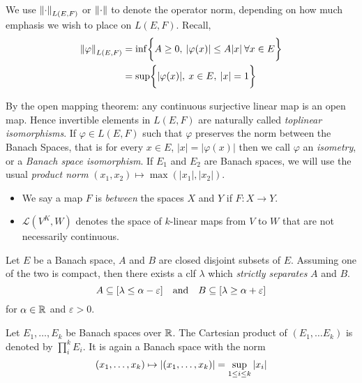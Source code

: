 \documentclass[../main-v2-manifolds.tex]{subfiles}
\begin{document}

We use $\norm{\cdot}_{L(E,F)}$ or $\norm{\cdot}$ to denote the operator norm, depending on how much emphasis we wish to place on $L(E,F)$. Recall,
\begin{align*}
\norm{\varphi}_{L(E,F)} &= \inf\biggl\{{A\geq 0,\: \vert\varphi(x)\vert\leq A\vert x\vert\:\forall x\in E}\biggr\}\\
&= \sup\biggl\{{\vert\varphi(x)\vert,\: x\in E,\: \vert x\vert=1}\biggr\}
\end{align*}


By the open mapping theorem: any continuous surjective linear map is an open map. Hence invertible elements in $L(E,F)$ are naturally called \emph{toplinear isomorphisms}. If $\varphi\in L(E,F)$ such that $\varphi$ preserves the norm between the Banach Spaces, that is for every $x\in E$, $\vert x\vert = \vert \varphi(x)\vert$ then we call $\varphi$ an \emph{isometry}, or a \emph{Banach space isomorphism}. If $E_1$ and $E_2$ are Banach spaces, we will use the usual \emph{product norm} $(x_1, x_2)\mapsto \max(\vert x_1\vert,\vert x_2\vert)$. 

\begin{itemize}
    \item We say a map $F$ is \emph{between} the spaces $X$ and $Y$ if $F: X\to Y$. 
    \item $\mathcal{L}(V^K,W)$ denotes the space of $k$-linear maps from $V$ to $W$ that are not necessarily continuous. 
\end{itemize}
%



\begin{wts}\label{prop:hahn-banach-geometric-form}
    Let $E$ be a Banach space, $A$ and $B$ are closed disjoint subsets of $E$. Assuming one of the two is compact, then there exists a clf $\lambda$ which \emph{strictly separates} $A$ and $B$. 
    \begin{equation}\label{eq:hahn-banach-geometric-form}
        A\subseteq [\lambda \leq \alpha-\varepsilon]\qqtext{and} B\subseteq [\lambda\geq\alpha + \varepsilon]
    \end{equation}
    for $\alpha\in\mathbb{R}$ and $\varepsilon>0$.
\end{wts}


\begin{definition}\label{def:finite-product-banach-space}
    Let $E_1,\ldots, E_k$ be Banach spaces over $\mathbb{R}$. The Cartesian product of $(E_1,\ldots E_k)$ is denoted by $\prod_i^k E_i$. It is again a Banach space with the norm
    \begin{equation}\label{eq:finite-product-banach-space-norm}
        (x_1,\ldots, x_k)\mapsto \vert {(x_1,\ldots, x_k)} \vert = \sup_{1 \leq i\leq k}\vert {x_i} \vert
    \end{equation}
\end{definition}
\end{document}
